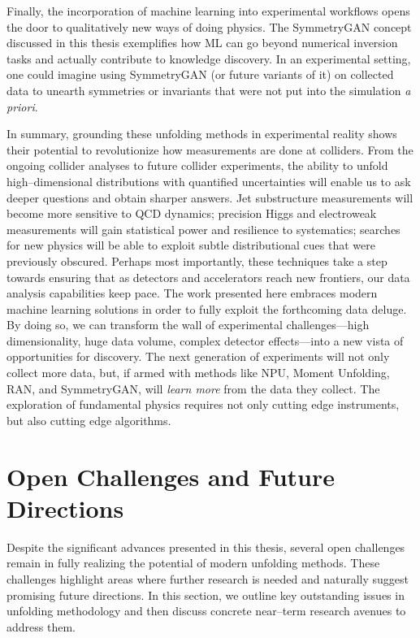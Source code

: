         Finally, the incorporation of machine learning into experimental workflows opens the door to qualitatively new ways of doing physics.
        The SymmetryGAN concept discussed in this thesis exemplifies how ML can go beyond numerical inversion tasks and actually contribute to {knowledge discovery}.
        In an experimental setting, one could imagine using SymmetryGAN (or future variants of it) on collected data to unearth symmetries or invariants that were not put into the simulation \textit{a priori}.
    
        In summary, grounding these unfolding methods in experimental reality shows their potential to revolutionize how measurements are done at colliders.
        From the ongoing collider analyses to future collider experiments, the ability to unfold high--dimensional distributions with quantified uncertainties will enable us to ask deeper questions and obtain sharper answers.
        Jet substructure measurements will become more sensitive to QCD dynamics;
        precision Higgs and electroweak measurements will gain statistical power and resilience to systematics;
        searches for new physics will be able to exploit subtle distributional cues that were previously obscured.
        Perhaps most importantly, these techniques take a step towards ensuring that as detectors and accelerators reach new frontiers, our data analysis capabilities keep pace.
        The work presented here embraces modern machine learning solutions in order to fully exploit the forthcoming data deluge.
        By doing so, we can transform the wall of experimental challenges---high dimensionality, huge data volume, complex detector effects---into a new vista of opportunities for discovery.
        The next generation of experiments will not only collect more data, but, if armed with methods like NPU, Moment Unfolding, RAN, and SymmetryGAN, will \emph{learn more} from the data they collect.
        The exploration of fundamental physics requires not only cutting edge instruments, but also cutting edge algorithms.

\section{Open Challenges and Future Directions}
    Despite the significant advances presented in this thesis, several open challenges remain in fully realizing the potential of modern unfolding methods.
    These challenges highlight areas where further research is needed and naturally suggest promising future directions.
    In this section, we outline key outstanding issues in unfolding methodology and then discuss concrete near--term research avenues to address them.
        
